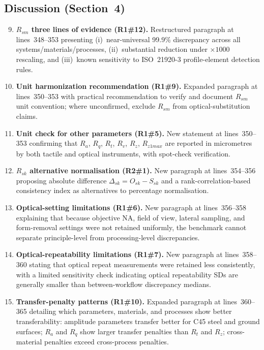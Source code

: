 \documentclass[10pt]{article}
\begin{document}
\subsection*{Discussion (Section~4)}

\begin{enumerate}[leftmargin=*, label=\textbf{C\arabic*.}, ref=C\arabic*]
\setcounter{enumi}{8}

\item \textbf{$R_{sm}$ three lines of evidence (R1\#12).} Restructured paragraph at lines~348--353 presenting (i)~near-universal 99.9\% discrepancy across all systems/materials/processes, (ii)~substantial reduction under $\times 1000$ rescaling, and (iii)~known sensitivity to ISO~21920-3 profile-element detection rules.

\item \textbf{Unit harmonization recommendation (R1\#9).} Expanded paragraph at lines~350--353 with practical recommendation to verify and document $R_{sm}$ unit convention; where unconfirmed, exclude $R_{sm}$ from optical-substitution claims.

\item \textbf{Unit check for other parameters (R1\#5).} New statement at lines~350--353 confirming that $R_a$, $R_q$, $R_t$, $R_v$, $R_z$, $R_{z1max}$ are reported in micrometres by both tactile and optical instruments, with spot-check verification.

\item \textbf{$R_{sk}$ alternative normalisation (R2\#1).} New paragraph at lines~354--356 proposing absolute difference $\Delta_{sk}=O_{sk}-S_{sk}$ and a rank-correlation-based consistency index as alternatives to percentage normalisation.

\item \textbf{Optical-setting limitations (R1\#6).} New paragraph at lines~356--358 explaining that because objective NA, field of view, lateral sampling, and form-removal settings were not retained uniformly, the benchmark cannot separate principle-level from processing-level discrepancies.

\item \textbf{Optical-repeatability limitations (R1\#7).} New paragraph at lines~358--360 stating that optical repeat measurements were retained less consistently, with a limited sensitivity check indicating optical repeatability SDs are generally smaller than between-workflow discrepancy medians.

\item \textbf{Transfer-penalty patterns (R1\#10).} Expanded paragraph at lines~360--365 detailing which parameters, materials, and processes show better transferability: amplitude parameters transfer better for C45 steel and ground surfaces; $R_a$ and $R_q$ show larger transfer penalties than $R_t$ and $R_z$; cross-material penalties exceed cross-process penalties.


\end{enumerate}
\end{document}
